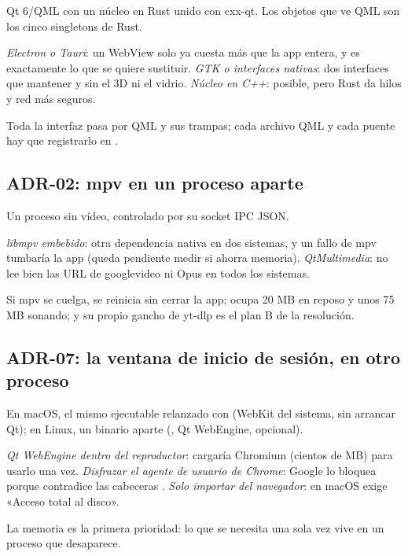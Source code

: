 \begin{description}[style=nextline, leftmargin=0pt]
  \item[Se eligió] Qt 6/QML con un núcleo en Rust unido con cxx-qt. Los objetos que ve QML son
  los cinco singletons de Rust.
  \item[Se descartó] \emph{Electron o Tauri}: un WebView solo ya cuesta más que la app
  entera, y es exactamente lo que se quiere sustituir. \emph{GTK o interfaces nativas}: dos
  interfaces que mantener y sin el 3D ni el vidrio. \emph{Núcleo en C++}: posible, pero Rust
  da hilos y red más seguros.
  \item[Consecuencia] Toda la interfaz pasa por QML y sus trampas; cada archivo QML y cada
  puente hay que registrarlo en .
\end{description}

\subsection{ADR-02: mpv en un proceso aparte}

\begin{description}[style=nextline, leftmargin=0pt]
  \item[Se eligió] Un proceso  sin vídeo, controlado por su socket IPC JSON.
  \item[Se descartó] \emph{libmpv embebido}: otra dependencia nativa en dos sistemas, y un
  fallo de mpv tumbaría la app (queda pendiente medir si ahorra memoria). \emph{QtMultimedia}:
  no lee bien las URL de googlevideo ni Opus en todos los sistemas.
  \item[Por qué es buena idea] Si mpv se cuelga, se reinicia sin cerrar la app; ocupa 20 MB
  en reposo y unos 75 MB sonando; y su propio gancho de yt-dlp es el plan B de la resolución.
\end{description}

\subsection{ADR-07: la ventana de inicio de sesión, en otro proceso}

\begin{description}[style=nextline, leftmargin=0pt]
  \item[Se eligió] En macOS, el mismo ejecutable relanzado con  (WebKit del
  sistema, sin arrancar Qt); en Linux, un binario aparte (, Qt WebEngine,
  opcional).
  \item[Se descartó] \emph{Qt WebEngine dentro del reproductor}: cargaría Chromium (cientos
  de MB) para usarlo una vez. \emph{Disfrazar el agente de usuario de Chrome}: Google lo
  bloquea porque contradice las cabeceras . \emph{Solo importar del
  navegador}: en macOS exige «Acceso total al disco».
  \item[Lección general] La memoria es la primera prioridad: lo que se necesita una sola vez
  vive en un proceso que desaparece.
\end{description}

